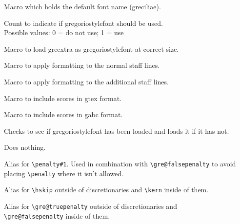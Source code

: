 Macro which holds the default font name (greciliae).

Count to indicate if gregoriostylefont should be used.\\
Possible values: 0 = do not use; 1 = use

Macro to load greextra as gregoriostylefont at correct size.
	
Macro to apply formatting to the normal staff lines.
	
Macro to apply formatting to the additional staff lines.

Macro to include scores in gtex format.

Macro to include scores in gabc format.

Checks to see if gregoriostylefont has been loaded and loads it if it has not.

Does nothing.

Alias for \verb=\penalty#1=.  Used in combination with
\verb=\gre@falsepenalty= to avoid placing \verb=\penalty= where it
isn't allowed.

Alias for \verb=\hskip= outside of discretionaries and \verb=\kern=
inside of them.

Alias for \verb=\gre@truepenalty= outside of discretionaries and\\
\verb=\gre@falsepenalty= inside of them.


